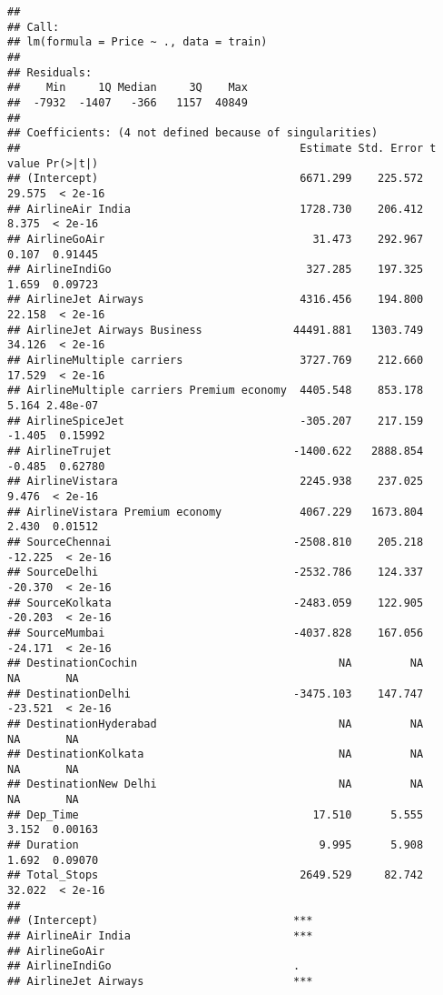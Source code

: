 \documentclass[
]{article}
\begin{document}
\begin{verbatim}
## 
## Call:
## lm(formula = Price ~ ., data = train)
## 
## Residuals:
##    Min     1Q Median     3Q    Max 
##  -7932  -1407   -366   1157  40849 
## 
## Coefficients: (4 not defined because of singularities)
##                                           Estimate Std. Error t value Pr(>|t|)
## (Intercept)                               6671.299    225.572  29.575  < 2e-16
## AirlineAir India                          1728.730    206.412   8.375  < 2e-16
## AirlineGoAir                                31.473    292.967   0.107  0.91445
## AirlineIndiGo                              327.285    197.325   1.659  0.09723
## AirlineJet Airways                        4316.456    194.800  22.158  < 2e-16
## AirlineJet Airways Business              44491.881   1303.749  34.126  < 2e-16
## AirlineMultiple carriers                  3727.769    212.660  17.529  < 2e-16
## AirlineMultiple carriers Premium economy  4405.548    853.178   5.164 2.48e-07
## AirlineSpiceJet                           -305.207    217.159  -1.405  0.15992
## AirlineTrujet                            -1400.622   2888.854  -0.485  0.62780
## AirlineVistara                            2245.938    237.025   9.476  < 2e-16
## AirlineVistara Premium economy            4067.229   1673.804   2.430  0.01512
## SourceChennai                            -2508.810    205.218 -12.225  < 2e-16
## SourceDelhi                              -2532.786    124.337 -20.370  < 2e-16
## SourceKolkata                            -2483.059    122.905 -20.203  < 2e-16
## SourceMumbai                             -4037.828    167.056 -24.171  < 2e-16
## DestinationCochin                               NA         NA      NA       NA
## DestinationDelhi                         -3475.103    147.747 -23.521  < 2e-16
## DestinationHyderabad                            NA         NA      NA       NA
## DestinationKolkata                              NA         NA      NA       NA
## DestinationNew Delhi                            NA         NA      NA       NA
## Dep_Time                                    17.510      5.555   3.152  0.00163
## Duration                                     9.995      5.908   1.692  0.09070
## Total_Stops                               2649.529     82.742  32.022  < 2e-16
##                                             
## (Intercept)                              ***
## AirlineAir India                         ***
## AirlineGoAir                                
## AirlineIndiGo                            .  
## AirlineJet Airways                       ***

\end{verbatim}
\end{document}
